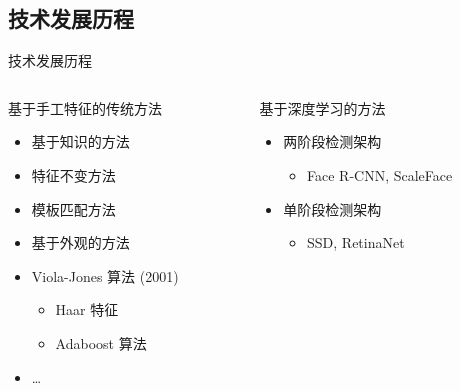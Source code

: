 \documentclass{beamer}
\begin{document}
\subsection{技术发展历程}
\begin{frame}{技术发展历程}
\begin{columns}[T]
\begin{column}{0.48\textwidth}
    基于手工特征的传统方法
    \begin{itemize}
        \item 基于知识的方法
        \item 特征不变方法
        \item 模板匹配方法
        \item 基于外观的方法
        \item Viola-Jones 算法 (2001)
        \begin{itemize}
            \item Haar 特征
            \item Adaboost 算法
        \end{itemize}
        \item \dots
    \end{itemize}
\end{column}

\begin{column}{0.48\textwidth}
    基于深度学习的方法
    \begin{itemize}
        \item 两阶段检测架构
        \begin{itemize}
            \item Face R-CNN, ScaleFace
        \end{itemize}
        \item 单阶段检测架构
        \begin{itemize}
            \item SSD, RetinaNet
        \end{itemize}
    \end{itemize}
\end{column}
\end{columns}
\end{frame}

\end{document}
